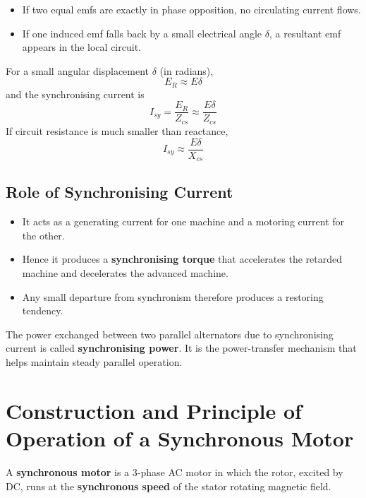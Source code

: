\documentclass[12pt,a4paper]{article}
\begin{document}
\begin{itemize}[leftmargin=*]
  \item If two equal emfs are exactly in phase opposition, no circulating current flows.
  \item If one induced emf falls back by a small electrical angle \(\delta\), a resultant emf appears in the local circuit.
\end{itemize}

\begin{formulabox}
For a small angular displacement \(\delta\) (in radians),
\[
  E_R \approx E\delta
\]
and the synchronising current is
\[
  I_{sy} = \frac{E_R}{Z_{cs}} \approx \frac{E\delta}{Z_{cs}}
\]
If circuit resistance is much smaller than reactance,
\[
  I_{sy} \approx \frac{E\delta}{X_{cs}}
\]
\end{formulabox}

\subsection{Role of Synchronising Current}

\begin{itemize}[leftmargin=*]
  \item It acts as a generating current for one machine and a motoring current for the other.
  \item Hence it produces a \textbf{synchronising torque} that accelerates the retarded machine and decelerates the advanced machine.
  \item Any small departure from synchronism therefore produces a restoring tendency.
\end{itemize}

\begin{importantbox}
The power exchanged between two parallel alternators due to synchronising current is called
\textbf{synchronising power}. It is the power-transfer mechanism that helps maintain steady
parallel operation.
\end{importantbox}

\section{Construction and Principle of Operation of a Synchronous Motor}

\begin{definebox}
A \textbf{synchronous motor} is a 3-phase AC motor in which the rotor, excited by DC, runs at the
\textbf{synchronous speed} of the stator rotating magnetic field.
\end{definebox}
\end{document}
